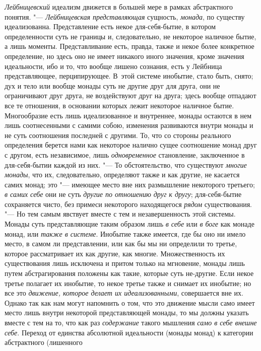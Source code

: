 {\em Лейбницевский} идеализм движется в большей мере в
рамках абстрактного понятия. "--- {\em Лейбницевская
представляющая} сущность, {\em монада}, по существу
идеализованна. Представление есть некое для-себя-бытие, в котором
определенности суть не границы и, следовательно, не некоторое наличное
бытие, а лишь моменты. Представливание есть, правда, также и некое более
конкретное определение, но здесь оно не имеет никакого иного значения,
кроме значения идеальности, ибо и то, что вообще лишено сознания, есть у
Лейбница представляющее, перципирующее. В~этой системе инобытие, стало
быть, снято; дух и тело или вообще монады суть не другие друг для друга,
они не ограничивают друг друга, не воздействуют друг на друга; здесь вообще
отпадают все те отношения, в основании которых лежит некоторое наличное
бытие. Многообразие есть лишь идеализованное и внутреннее, монады остаются
в нем лишь соотнесенными с самими собою, изменения развиваются внутри
монады и не суть соотношения последней с другими. То, что со стороны
реального определения берется нами как некоторое налично сущее соотношение
монад друг с другом, есть независимое, лишь
{\em одновременное} становление, заключенное в
для-себя-бытии каждой из них. "--- То обстоятельство, что существуют
{\em многие монады}, что их, следовательно, определяют
также и как другие, не касается самих монад; это "--- имеющее место вне них
размышление некоторого третьего; {\em в самих себе} они
не суть {\em другие по отношению друг к другу};
для-себя-бытие сохраняется чисто, без примеси некоторого находящегося
{\em рядом} существования. "--- Но тем самым явствует
вместе с тем и незавершенность этой системы. Монады суть представляющие
таким образом лишь {\em в себе} или {\em в боге} как монаде монад, или
{\em также в системе}. Инобытие также имеется, где бы
оно ни имело место, в самом ли представлении, или как бы мы ни определили
то третье, которое рассматривает их как другие, как многие. Множественность
их существования лишь исключена и притом только на мгновение, монады лишь
путем абстрагирования положены как такие, которые суть не-другие. Если
некое третье полагает их инобытие, то некое третье также и снимает их
инобытие; но все это {\em движение, которое делает их
идеализованными}, совершается вне их. Однако так как нам могут напомнить о
том, что это движение мысли само имеет место лишь внутри некоторой
представляющей монады, то мы должны указать вместе с тем на то, что как раз
{\em содержание} такого мышления
{\em само в себе внешне себе}. Переход от единства
абсолютной идеальности (монады монад) к категории абстрактного (лишенного
